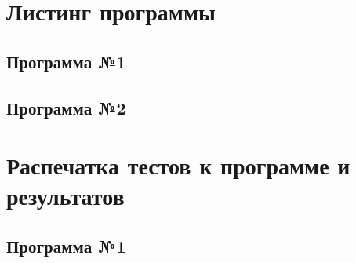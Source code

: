 \newpage
\section{Листинг программы}

\subsection{Программа №1}


\subsection{Программа №2}


\newpage
\section{Распечатка тестов к программе и результатов}

\subsection{Программа №1}

